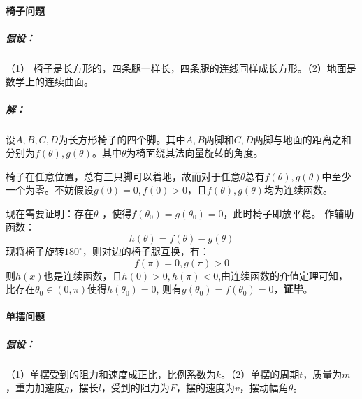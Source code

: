 \documentclass[UTF8]{ctexart}
\begin{document}
\paragraph*{椅子问题}

\subparagraph*{假设：} 
（1） 椅子是长方形的，四条腿一样长，四条腿的连线同样成长方形。（2）地面是数学上的连续曲面。

\subparagraph*{解：}
设$A,B,C,D$为长方形椅子的四个脚。其中$A,B$两脚和$C,D$两脚与地面的距离之和分别为$f(\theta), g(\theta)$。其中$\theta$为椅面绕其法向量旋转的角度。

椅子在任意位置，总有三只脚可以着地，故而对于任意$\theta$总有$f(\theta),g(\theta)$中至少一个为零。不妨假设$g(0)=0,f(0)>0$，且$f(\theta),g(\theta)$均为连续函数。

现在需要证明：存在$\theta_0$，使得$f(\theta_0)=g(\theta_0)=0$，此时椅子即放平稳。
作辅助函数：$$h(\theta)=f(\theta)-g(\theta)$$
现将椅子旋转$180^\circ$，则对边的椅子腿互换，有：
$$f(\pi)=0,g(\pi)>0$$
则$h(x)$也是连续函数，且$h(0)>0,h(\pi)<0$,由连续函数的介值定理可知，比存在$\theta_0 \in (0,\pi)$使得$h(\theta_0)=0$, 则有$g(\theta_0)=f(\theta_0)=0$，\textbf{证毕}。


\paragraph*{单摆问题}

\subparagraph*{假设：}（1）单摆受到的阻力和速度成正比，比例系数为$k$。（2）单摆的周期$t$，质量为$m$，重力加速度$g$，摆长$l$，受到的阻力为$F$，摆的速度为$v$，摆动幅角$\theta$。
\end{document}
